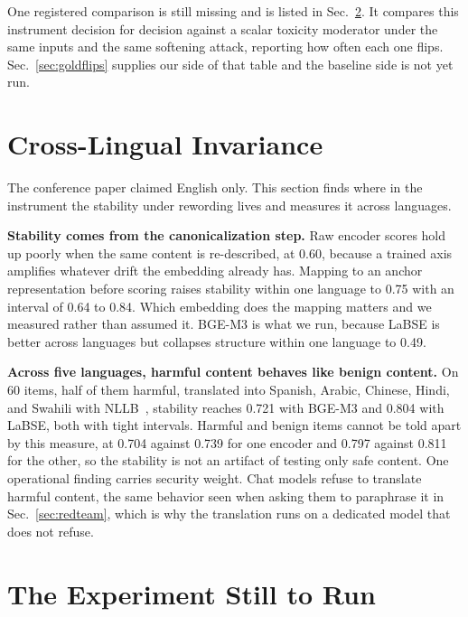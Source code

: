 \documentclass[journal]{IEEEtran}
\begin{document}
One registered comparison is still missing and is listed in
Sec.~\ref{sec:rerun}. It compares this instrument decision for decision
against a scalar toxicity moderator under the same inputs and the same
softening attack, reporting how often each one flips.
Sec.~\ref{sec:goldflips} supplies our side of that table and the baseline
side is not yet run.

\section{Cross-Lingual Invariance}
\label{sec:xling}

The conference paper claimed English only. This section finds where in the
instrument the stability under rewording lives and measures it across
languages.

\textbf{Stability comes from the canonicalization step.} Raw encoder scores
hold up poorly when the same content is re-described, at 0.60, because a
trained axis amplifies whatever drift the embedding already has. Mapping to
an anchor representation before scoring raises stability within one language
to 0.75 with an interval of 0.64 to 0.84. Which embedding does the mapping
matters and we measured rather than assumed it. BGE-M3 is what we run,
because LaBSE is better across languages but collapses structure within one
language to 0.49.

\textbf{Across five languages, harmful content behaves like benign content.}
On 60 items, half of them harmful, translated into Spanish, Arabic, Chinese,
Hindi, and Swahili with NLLB~\cite{nllbteam2022no}, stability reaches 0.721
with BGE-M3 and 0.804 with LaBSE, both with tight intervals. Harmful and
benign items cannot be told apart by this measure, at 0.704 against 0.739 for
one encoder and 0.797 against 0.811 for the other, so the stability is not an
artifact of testing only safe content. One operational finding carries
security weight. Chat models refuse to translate harmful content, the same
behavior seen when asking them to paraphrase it in Sec.~\ref{sec:redteam},
which is why the translation runs on a dedicated model that does not refuse.

\section{The Experiment Still to Run}
\label{sec:rerun}
\end{document}
